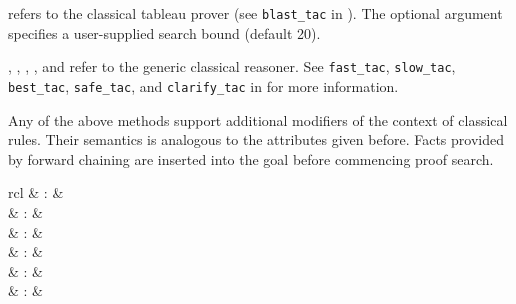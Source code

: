 \begin{isabellebody}
\begin{isamarkuptext}
  \begin{description}

  \item \hyperlink{method.blast}{\mbox{}} refers to the classical tableau prover (see
  \verb|blast_tac| in \cite{isabelle-ref}).  The optional argument
  specifies a user-supplied search bound (default 20).

  \item \hyperlink{method.fast}{\mbox{}}, \hyperlink{method.slow}{\mbox{}}, \hyperlink{method.best}{\mbox{}}, \hyperlink{method.safe}{\mbox{}}, and \hyperlink{method.clarify}{\mbox{}} refer to the generic classical
  reasoner.  See \verb|fast_tac|, \verb|slow_tac|, \verb|best_tac|, \verb|safe_tac|, and \verb|clarify_tac| in \cite{isabelle-ref} for more
  information.

  \end{description}

  Any of the above methods support additional modifiers of the context
  of classical rules.  Their semantics is analogous to the attributes
  given before.  Facts provided by forward chaining are inserted into
  the goal before commencing proof search.%
\end{isamarkuptext}%
\isamarkuptrue%
%
\isamarkuptrue%
%
\begin{isamarkuptext}%
\begin{matharray}{rcl}
    \hypertarget{method.auto}{\hyperlink{method.auto}{\mbox{}}} & : &  \\
    \hypertarget{method.force}{\hyperlink{method.force}{\mbox{}}} & : &  \\
    \hypertarget{method.clarsimp}{\hyperlink{method.clarsimp}{\mbox{}}} & : &  \\
    \hypertarget{method.fastsimp}{\hyperlink{method.fastsimp}{\mbox{}}} & : &  \\
    \hypertarget{method.slowsimp}{\hyperlink{method.slowsimp}{\mbox{}}} & : &  \\
    \hypertarget{method.bestsimp}{\hyperlink{method.bestsimp}{\mbox{}}} & : &  \\
  \end{matharray}


\end{isamarkuptext}
\end{isabellebody}
